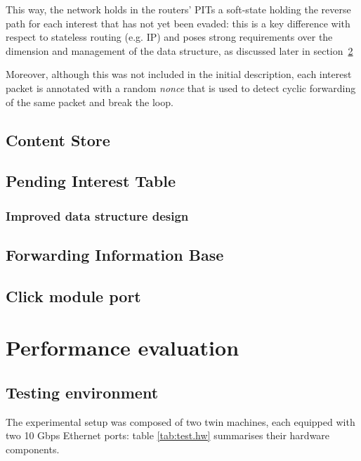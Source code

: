 \documentclass[12pt,a4paper,twoside]{book}
\begin{document}
This way, the network holds in the routers' \gls{PIT}s a soft-state holding the reverse path for each interest that has not yet been evaded: this is a key difference with respect to stateless routing (e.g. IP) and poses strong requirements over the dimension and management of the data structure, as discussed later in section~\ref{sec:augustus.pit}

Moreover, although this was not included in the initial description, each interest packet is annotated with a random \textit{nonce} that is used to detect cyclic forwarding of the same packet and break the loop.

\section{Content Store}\label{sec:augustus.cs}

\section{Pending Interest Table}\label{sec:augustus.pit}

\subsection{Improved data structure design}\label{sec:augustus.pit.new}

\section{Forwarding Information Base}\label{sec:augustus.fib}

\section{Click module port}\label{sec:augustus.click}



\chapter{Performance evaluation}
\label{chap:test}

\section{Testing environment}\label{sec:test.env}
The experimental setup was composed of two twin machines, each equipped with two 10 Gbps Ethernet ports:
table \ref{tab:test.hw} summarises their hardware components.
\end{document}
